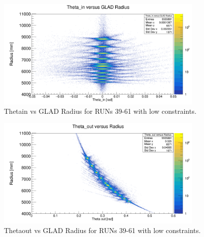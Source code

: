 \documentclass[12pt, letterpaper]{article}
\begin{document}
\begin{appendices}
\begin{figure}[!htb]
	\centering
	\includegraphics[width=0.9\textwidth]{theta_in_rad_low_constr.png}
	\caption{Theta\textunderscore in vs GLAD Radius for RUNs 39-61 with low constraints.}
	\label{fig:theta_in_rad_low_const}
\end{figure}

\begin{figure}[!htb]
	\centering
	\includegraphics[width=0.9\textwidth]{theta_out_vs_rad_low_constr.png}
	\caption{Theta\textunderscore out vs GLAD Radius for RUNs 39-61 with low constraints.}
	\label{fig:theta_out_rad_low_const}
\end{figure}
\newpage

\end{appendices}
\end{document}
